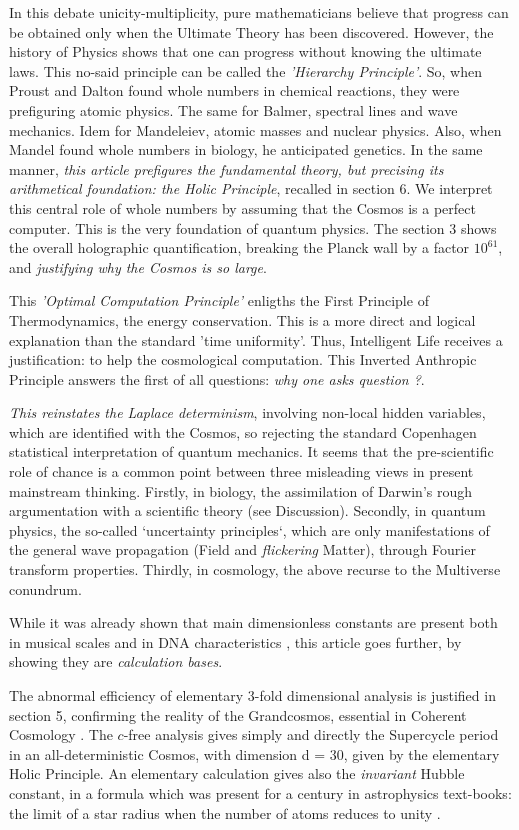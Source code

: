 \documentclass[twoside,draft]{article}
\begin{document}
\begin{sloppypar}
In this debate unicity-multiplicity, pure mathematicians believe that progress can be obtained only when the Ultimate Theory has been discovered. However, the history of Physics shows that one can progress without knowing the ultimate laws. This no-said principle can be called the \textit{'Hierarchy Principle'}. So, when Proust and Dalton found whole numbers in chemical reactions, they were prefiguring atomic physics. The same for Balmer, spectral lines and wave mechanics. Idem for Mandeleiev, atomic masses and nuclear physics. Also, when Mandel found whole numbers in biology, he anticipated genetics. In the same manner, \textit{this article prefigures the fundamental theory, but precising its arithmetical foundation: the Holic Principle}, recalled in section 6. We interpret this central role of whole numbers by assuming that the Cosmos is a perfect computer. This is the very foundation of quantum physics. The section 3 shows the overall holographic quantification, breaking the Planck wall by a factor $10^{61}$, and \textit{justifying why the Cosmos is so large}.

This \textit{'Optimal Computation Principle'} enligths the First Principle of Thermodynamics, the energy conservation. This is a more direct and logical explanation than the standard 'time uniformity'. Thus, Intelligent Life receives a justification: to help the cosmological computation. This Inverted Anthropic Principle answers the first of all questions: \textit{why one asks question ?}. 

\textit{This reinstates the Laplace determinism}, involving non-local hidden variables, which are identified with the Cosmos, so rejecting the standard Copenhagen statistical interpretation of quantum mechanics. It seems that the pre-scientific role of chance is a common point between three misleading views in present mainstream thinking. Firstly, in biology, the assimilation of Darwin's rough argumentation with a scientific theory (see Discussion). Secondly, in quantum physics, the so-called `uncertainty principles`, which are only manifestations of the general wave propagation (Field and \textit{flickering} Matter), through Fourier transform properties. Thirdly, in cosmology, the above recurse to the Multiverse conundrum.

While it was already shown that main dimensionless constants are present both in musical scales and in DNA characteristics \cite{Sanchez1}, this article goes further, by showing they are \textit{calculation bases}.

The abnormal efficiency of elementary 3-fold dimensional analysis is justified in section 5, confirming the reality of the Grandcosmos, essential in Coherent Cosmology \cite{Sanchez1}. The $c$-free analysis gives simply and directly the Supercycle period in an all-deterministic Cosmos, with dimension d = 30, given by the elementary Holic Principle. An elementary calculation gives also the \textit{invariant} Hubble constant, in a formula which was present for a century in astrophysics text-books: the limit of a star radius when the number of atoms reduces to unity \cite{Sanchez1}.


\end{sloppypar}
\end{document}

